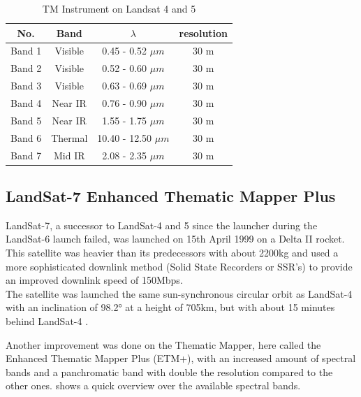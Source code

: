 \begin{table}[h!]
	\centering
	\begin{tabular}{ | c | c | c | c |}
	\hline
	\textbf{No.} & \textbf{Band} & \textbf{$\lambda$} & \textbf{resolution} \\
	\hline
	Band 1 & Visible & 0.45 - 0.52 $\mu m$ & {30 m} \\
	Band 2 & Visible & 0.52 - 0.60 $\mu m$ & {30 m} \\
	Band 3 & Visible & 0.63 - 0.69 $\mu m$ & {30 m} \\
	Band 4 & Near IR & 0.76 - 0.90 $\mu m$ & {30 m} \\
	Band 5 & Near IR & 1.55 - 1.75 $\mu m$ & {30 m} \\
	Band 6 & Thermal & 10.40 - 12.50 $\mu m$ & {30 m} \\
	Band 7 & Mid IR & 2.08 - 2.35 $\mu m$ & {30 m} \\
	\hline
	\end{tabular}
	\caption{TM Instrument on Landsat 4 and 5\citep{l4:usgs,l5:usgs}}
	\label{tab:L45TM}
\end{table}




\subsection{LandSat-7 Enhanced Thematic Mapper Plus}
LandSat-7, a successor to LandSat-4 and 5 since the launcher during the LandSat-6 launch failed, was launched on 15th April 1999 on a Delta II rocket. This satellite was heavier than its predecessors with about 2200kg and used a more sophisticated downlink method (Solid State Recorders or SSR's) to provide an improved downlink speed of 150Mbps.\\
The satellite was launched the same sun-synchronous circular orbit as LandSat-4 with an inclination of 98.2° at a height of 705km, but with about 15 minutes behind LandSat-4 \citep{l7:usgs}.

Another improvement was done on the Thematic Mapper, here called the Enhanced Thematic Mapper Plus (ETM+), with an increased amount of spectral bands and a panchromatic band with double the resolution compared to the other ones.  shows a quick overview over the available spectral bands.

